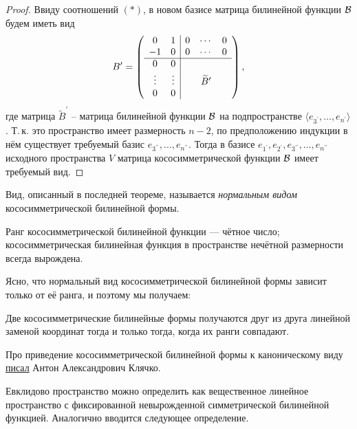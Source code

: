 \begin{proof}
    Ввиду соотношений $(\ast)$, в новом базисе матрица билинейной функции $\mathcal{B}$ будем иметь вид
    \[
        B^\prime =
        \left(
            \begin{array}{cc | ccc}
                0 & 1 & 0 & \cdots & 0\\
                -1 & 0 & 0 & \cdots & 0\\
                \hline
                0 & 0 &  &  &  \\
                \vdots & \vdots &  &  \widetilde{B}^\prime &  \\
                0 & 0 &  &  &  
            \end{array}
        \right),
    \]
    где матрица $\widetilde{B}^\prime$ -- матрица билинейной функции $\mathcal{B}$ на подпространстве $\langle e_{3^\prime}, \ldots, e_{n^\prime}\rangle$. Т.\,к. это пространство имеет размерность $n - 2$, по предположению индукции в нём существует требуемый базис $e_{3^{\prime\prime}}, \ldots, e_{n^{\prime\prime}}$. Тогда в базисе $e_{1^\prime}, e_{2^\prime}, e_{3^{\prime\prime}}, \ldots, e_{n^{\prime\prime}}$ исходного пространства $V$ матрица кососимметрической функции $\mathcal{B}$ имеет требуемый вид.
\end{proof}

\begin{definition}
    Вид, описанный в последней теореме, называется \textit{нормальным видом} кососимметрической билинейной формы.
\end{definition}

\begin{corollary}
    Ранг кососимметрической билинейной функции --- чётное число; кососимметрическая билинейная функция в пространстве нечётной размерности всегда вырождена.
\end{corollary}

Ясно, что нормальный вид кососимметрической билинейной формы зависит только от её ранга, и поэтому мы получаем:

\begin{proposal}
    Две кососимметрические билинейные формы получаются друг из друга линейной заменой координат тогда и только тогда, когда их ранги совпадают.
\end{proposal}

Про приведение кососимметрической билинейной формы к каноническому виду \href{http://halgebra.math.msu.su/staff/klyachko/teaching/lin.al/SQ.PDF}{писал} Антон Александрович Клячко.

Евклидово пространство можно определить как вещественное линейное пространство с фиксированной невырожденной симметрической билинейной функцией. Аналогично вводится следующее определение.

